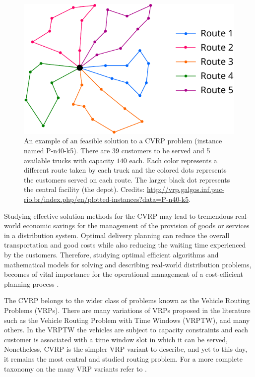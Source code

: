 \begin{figure}[ht]
	\centering
	\includegraphics[width=12cm]{Imgs/P-n40-k5-solution.out.cropped.pdf}
	\caption{An example of an feasible solution to a CVRP problem (instance named P-n40-k5).
		There are 39 customers to be served and 5 available trucks with capacity $140$ each. Each color
		represents a different route taken by each truck and the colored dots
		represents the customers served on each route.
		The larger black dot represents the central facility (the depot).
		Credits: \url{http://vrp.galgos.inf.puc-rio.br/index.php/en/plotted-instances?data=P-n40-k5}.
	}
	\label{fig:cvrp-optimal-solution-example}
\end{figure}


Studying effective solution methods for the CVRP may lead to tremendous real-world economic
savings for the management of the provision of goods or services in a distribution system.
Optimal delivery planning can reduce the overall transportation and good costs while
also reducing the waiting time experienced by the customers.
Therefore, studying optimal efficient algorithms and mathematical models for
solving and describing real-world distribution problems,
becomes of vital importance
for the operational management of a cost-efficient planning process \parencite{toth2002,toth2014}.

The CVRP belongs to the wider class of problems known as the Vehicle Routing Problems (VRPs).
There are many variations of VRPs proposed in the literature such as
the Vehicle Routing Problem with Time Windows (VRPTW), and many others.
In the VRPTW \parencite{schrage1981} the vehicles are subject to capacity constraints and
each customer is associated with a time window slot in which it can be served,
Nonetheless, CVRP is the simpler VRP variant to describe,
and yet to this day, it remains the most central and studied routing problem.
For a more complete taxonomy on the many VRP variants refer to \textcite{eksioglu2009, braekers2016}.

